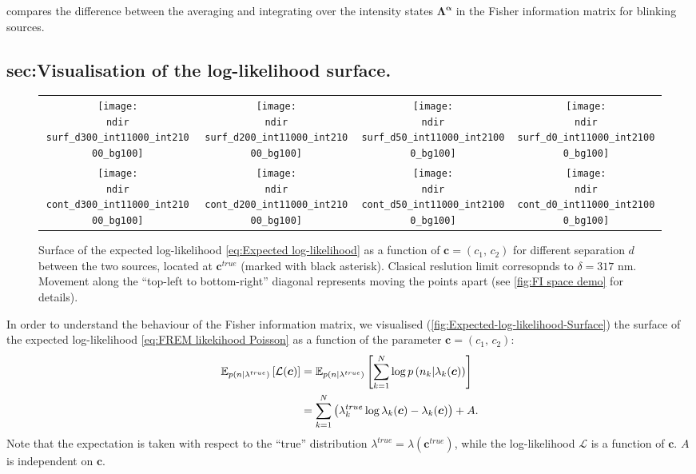  compares the difference between the averaging and integrating over the intensity states $\bm{\Lambda^\alpha}$ in the Fisher information matrix for blinking sources.

\subsection{sec:Visualisation of the log-likelihood surface.\label{sub:LL surface}}
\begin{figure}[thb]
	\centering
	\newcommand{\sizeff}{.18}
	\newcommand{\sizegg}{.16}
	\newcommand{\ndir}{\qd gFREM/images/LLsurface/}
	\begin{tabular}{cccc}
		\subfloat[$d=300$ nm]{\texttt{[image: \\ndir surf\_d300\_int11000\_int21000\_bg100]}} 		
		& \subfloat[$d=200$ nm]{\texttt{[image: \\ndir surf\_d200\_int11000\_int21000\_bg100]}} 		
		& \subfloat[$d=50$ nm]{\texttt{[image: \\ndir surf\_d50\_int11000\_int21000\_bg100]}} 		
		& \subfloat[$d=0$ nm]{\texttt{[image: \\ndir surf\_d0\_int11000\_int21000\_bg100]}} 		
		\tabularnewline
		\subfloat[$d=300$ nm]{\texttt{[image: \\ndir cont\_d300\_int11000\_int21000\_bg100]}} 
		& \subfloat[$d=200$ nm]{\texttt{[image: \\ndir cont\_d200\_int11000\_int21000\_bg100]}} 		
		& \subfloat[$d=50$ nm]{\texttt{[image: \\ndir cont\_d50\_int11000\_int21000\_bg100]}} 		
		& \subfloat[$d=0$ nm]{\texttt{[image: \\ndir cont\_d0\_int11000\_int21000\_bg100]}} 		
		\tabularnewline
	\end{tabular}
	\caption{Surface of the expected log-likelihood \autoref{eq:Expected log-likelihood} as a function of $\bm{c}=(c_1,\, c_2)$ for different separation $d$ between the two sources, located at $\bm{c}^{true}$ (marked with black asterisk). Clasical reslution limit corresopnds to $\delta=317$ nm. Movement along the ``top-left to bottom-right'' diagonal represents moving the points apart (see \autoref{fig:FI space demo} for details).}	
	\label{fig:Expected-log-likelihood-Surface}
\end{figure}

In order to understand the behaviour of the Fisher information matrix, we visualised (\autoref{fig:Expected-log-likelihood-Surface}) the surface of the expected log-likelihood \autoref{eq:FREM likekihood Poisson} as a function of the parameter $\bm{c}=(c_1,\, c_2)$: 
%
\begin{alignat}{2}
	\mathbb{E}_{p(n|\lambda^{true})}\left[\mathcal{L}(\bm{c})\right]
	&=\mathbb{E}_{p(n|\lambda^{true})}\left[\sum_{k=1}^N\log p\left(n_k|\lambda_k(\bm{c})\right)\right]\nonumber\\
	&=\sum_{k=1}^N\left(\lambda_k^{true}\log\lambda_k(\bm{c})-\lambda_k(\bm{c})\right)+A.
	\label{eq:Expected log-likelihood}
\end{alignat}
%
Note that the expectation is taken with respect to the ``true'' distribution $\lambda^{true}=\lambda(\bm{c}^{true})$, while the log-likelihood $\mathcal{L}$ is a function of $\bm{c}$. $A$ is independent on $\bm{c}$. 

